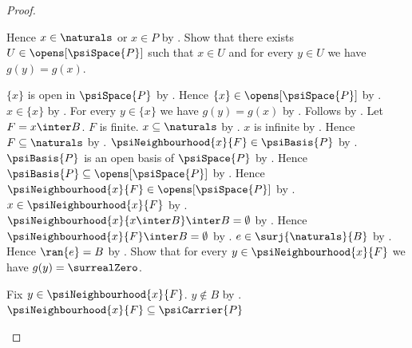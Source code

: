 \begin{proof}
\begin{subproof}
        Hence $x\in\naturals$ or $x\in P$ by
            .
        Show that there exists $U\in\opens[\psiSpace{P}]$ such that
            $x\in U$ and for every $y\in U$ we have $g(y)=g(x)$.
        \begin{subproof}
            \begin{byCase}
                    $\{x\}$ is open in $\psiSpace{P}$ by
                        .
                    Hence $\{x\}\in\opens[\psiSpace{P}]$ by
                        .
                    $x\in\{x\}$ by .
                    For every $y\in\{x\}$ we have $g(y)=g(x)$ by
                        .
                    Follows by \auto.
                    Let $F=x\inter B$.
                    $F$ is finite.
                    $x\subseteq\naturals$ by
                        .
                    $x$ is infinite by
                        .
                    Hence $F\subseteq\naturals$ by .
                    $\psiNeighbourhood{x}{F}\in\psiBasis{P}$ by
                        .
                    $\psiBasis{P}$ is an open basis of $\psiSpace{P}$ by
                        .
                    Hence $\psiBasis{P}\subseteq\opens[\psiSpace{P}]$ by
                        .
                    Hence $\psiNeighbourhood{x}{F}
                        \in\opens[\psiSpace{P}]$ by .
                    $x\in\psiNeighbourhood{x}{F}$ by
                        .
                    $\psiNeighbourhood{x}{x\inter B}\inter B=\emptyset$
                        by .
                    Hence $\psiNeighbourhood{x}{F}\inter B=\emptyset$
                        by \auto.
                    $e\in\surj{\naturals}{B}$ by
                        .
                    Hence $\ran{e}=B$ by .
                    Show that for every $y\in\psiNeighbourhood{x}{F}$
                        we have $g(y)=\surrealZero$.
                    \begin{subproof}
                        Fix $y\in\psiNeighbourhood{x}{F}$.
                        $y\notin B$ by .
                        $\psiNeighbourhood{x}{F}\subseteq\psiCarrier{P}$

\end{subproof}
\end{byCase}
\end{subproof}
\end{subproof}
\end{proof}

